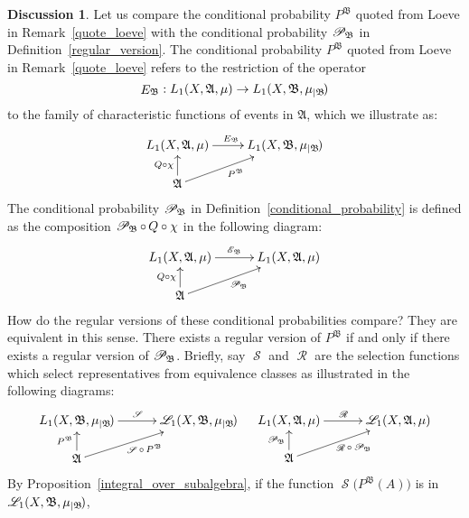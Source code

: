 \documentclass[
twoside=true,
paper=letter,
fontsize=9pt,
pagesize=auto,
leqno,
openany,
headsepline,
overfullrule,
]{scrbook}
\theoremstyle{plain}
\theoremstyle{plain}
\theoremstyle{definition}
\newtheorem{discussion}[thm]{Discussion}
\theoremstyle{bfnoteitalic}
\theoremstyle{bfnoteroman}
\newcommand{\sigalg}[1]{\mathfrak{#1}}
\newcommand{\cali}[1]{\mathscr{#1}}
\newcommand{\kondexpop}{\mathop{E}}
\newcommand{\condexpop}[1]{\mathop{\cali{E}\hspace{-1pt}}\nolimits_{#1}}
\newcommand{\condprobop}[1]{\mathop{\cali{P}\hspace{-1pt}}\nolimits_{#1}}
\newcommand{\restrictedto}[1]{_{\lvert#1}\kern-1.5pt}
\newcommand{\sigmaalgebra}{\sigalg{A}}
\newcommand{\sigmaalgebraii}{\sigalg{B}}
\newcommand{\Lone}{L_1(\measurespace, \sigmaalgebra, \measure)}
\newcommand{\caliLone}{\cali{L}_1(\measurespace, \sigmaalgebra, \measure)}
\newcommand{\measurespace}{X}
\newcommand{\measure}{\mu}
\newcommand{\seti}{A}
\newcommand{\regular}{\mathop{\cali{R}}}
\newcommand{\selection}{\mathop{\cali{S}}}
\begin{document}
\begin{discussion}\label{regular_version_equivalence}
Let us compare the conditional probability $P^{\sigalg{B}}$ quoted from Loeve in Remark~\ref{quote_loeve} with the conditional probability $\condprobop{\sigmaalgebraii}$ in Definition~\ref{regular_version}.  The conditional probability
$P^{\sigalg{B}}$ quoted from Loeve in Remark~\ref{quote_loeve} refers to the restriction of the operator
\[
\kondexpop\nolimits_{\sigmaalgebraii}
:
L_1(\measurespace, \sigmaalgebra,\measure) \to
L_1(\measurespace, \sigmaalgebraii,\measure\restrictedto{\sigmaalgebraii})
\]
to the family of characteristic functions of events in $\sigmaalgebra$, which we illustrate as:
\[
\xymatrix@R=16pt{
L_1(\measurespace, \sigmaalgebra,\measure )
\ar[r]^{\kondexpop\nolimits_{\sigmaalgebraii}}
&
L_1(\measurespace, \sigmaalgebraii,\measure\restrictedto{\sigmaalgebraii})
\\
\sigmaalgebra
\ar[u]^{Q\circ\chi}
\ar[ur]_{P^{\sigalg{B}}}
}
\]
The conditional probability $\condprobop{\sigmaalgebraii}$ in Definition~\ref{conditional_probability} is defined as the composition
$\condprobop{\sigmaalgebraii} \circ\, Q \circ\chi$
in the following diagram:
\[
\xymatrix@R=16pt@C=30pt{
\Lone \ar[r]^{\condexpop{\sigmaalgebraii}} & \Lone\\
\sigmaalgebra \ar[u]^{Q\circ\chi} \ar[ur]_{\condprobop{\sigmaalgebraii}} & \\
}
\]
How do the regular versions of these  conditional probabilities compare? They are equivalent in this sense.
There exists a regular version of
$P^{\sigalg{B}}$ if and only if there exists a regular version of
$\condprobop{\sigmaalgebraii}$.
Briefly, say $\selection$ and $\regular$ are the selection functions which select representatives from equivalence classes as  illustrated in the following diagrams:
\[
\xymatrix@R=16pt@C=30pt{
L_1(\measurespace, \sigmaalgebraii,\measure\restrictedto{\sigmaalgebraii})
\ar[r]^{\selection}
& \cali{L}_1(\measurespace, \sigmaalgebraii,\measure\restrictedto{\sigmaalgebraii})
\\
\sigmaalgebra
\ar[u]^{P^{\sigmaalgebraii}}
\ar[ur]_{\selection \circ \mathop{P^{\sigmaalgebraii}}}
&
}
\quad
\xymatrix@R=16pt@C=30pt{
\Lone \ar[r]^{\regular}
& \caliLone
\\
\sigmaalgebra
\ar[u]^{\condprobop{\sigmaalgebraii}}
\ar[ur]_{\ \regular\circ\condprobop{\sigmaalgebraii}}
&
}
\]
By Proposition~\ref{integral_over_subalgebra}, if the function
$\selection \bigl( P^\sigmaalgebraii (\seti) \bigr)$
is in
$\cali{L}_1(\measurespace, \sigmaalgebraii,\measure\restrictedto{\sigmaalgebraii})$,

\end{discussion}
\end{document}
